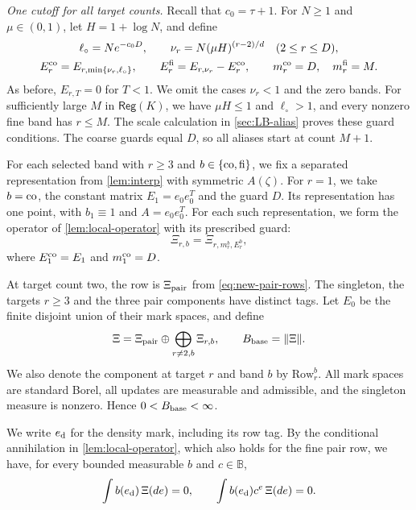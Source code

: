 \medskip\noindent\emph{One cutoff for all target counts.}
Recall that $c_0=\tau+1$. For $N\ge1$ and $\mu\in(0,1)$, let
$H=1+\log N$, and define
\begin{equation}\label{def:rows}
\begin{gathered}
 \ell_\circ=Ne^{-c_0D},\qquad
 \nu_r=N(\mu H)^{(r-2)/d}\quad(2\le r\le D),\\
 E_r^{\rm co}=E_{r,\min\{\nu_r,\ell_\circ\}},\qquad
 E_r^{\rm fi}=E_{r,\nu_r}-E_r^{\rm co},\qquad
 m_r^{\rm co}=D,\quad m_r^{\rm fi}=M.
\end{gathered}
\end{equation}
As before, $E_{r,T}=0$ for $T<1$. We omit the cases $\nu_r<1$ and
the zero bands. For sufficiently large $M$ in $\mathsf{Reg}(K)$, we
have $\mu H\le1$ and $\ell_\circ>1$, and every nonzero fine band has
$r\le M$. The scale calculation in \cref{sec:LB-alias} proves these
guard conditions. The coarse guards equal $D$, so all aliases start at
count $M+1$.

For each selected band with $r\ge3$ and $b\in\{{\rm co},{\rm fi}\}$,
we fix a separated representation from \cref{lem:interp} with
symmetric $A(\zeta)$. For $r=1$, we take $b={\rm co}$, the constant
matrix $E_1=e_0e_0^T$ and the guard $D$. Its representation has one
point, with $b_1\equiv1$ and $A=e_0e_0^T$. For each such
representation, we form the operator of \cref{lem:local-operator}
with its prescribed guard:
\begin{equation}\label{eq:LB-row-measure}
 \Xi_{r,b}=\Xi_{r,m_r^b,E_r^b},
\end{equation}
where $E_1^{\rm co}=E_1$ and $m_1^{\rm co}=D$.

At target count two, the row is $\Xi_{\rm pair}$ from
\eqref{eq:new-pair-rows}. The singleton, the targets $r\ge3$ and the
three pair components have distinct tags. Let $E_0$ be the finite
disjoint union of their mark spaces, and define
\begin{equation}\label{eq:LB-signed-measure}
 \Xi=\Xi_{\rm pair}\oplus\bigoplus_{r\ne2,b}\Xi_{r,b},\qquad B_{\rm base}=\|\Xi\|.
\end{equation}
We also denote the component at target $r$ and band $b$ by
$\mathrm{Row}_r^b$. All mark spaces are standard Borel, all updates
are measurable and admissible, and the singleton measure is nonzero.
Hence $0<B_{\rm base}<\infty$.

We write $e_{\rm d}$ for the density mark, including its row tag. By
the conditional annihilation in \cref{lem:local-operator}, which also
holds for the fine pair row, we have, for every bounded
measurable $b$ and $c\in\mathbb B$,
\begin{equation}\label{eq:LB-annihilation}
 \int b(e_{\rm d})\,\Xi(de)=0,\qquad
 \int b(e_{\rm d})c^e\,\Xi(de)=0.
\end{equation}

